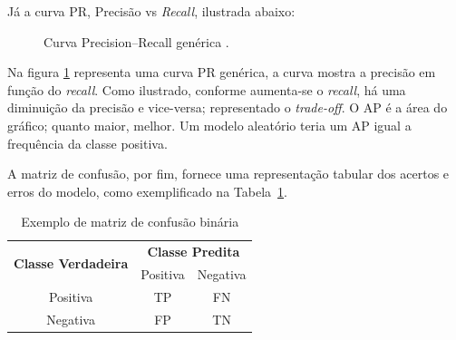 \documentclass[
    12pt,                %
    openright,           %
    oneside,             %
    a4paper,             %
    brazil               %
]{abntex2}
\begin{document}
Já a curva PR, Precisão vs \textit{Recall}, ilustrada abaixo:


\pgfplotsset{compat=1.18}

\begin{figure}[H]
    \centering
    \caption{Curva Precision–Recall genérica .}
    \label{fig:pr_curve_nv}
\end{figure}


Na figura \ref{fig:pr_curve_nv} representa uma curva PR genérica, a curva mostra a precisão em função do \textit{recall}. Como ilustrado,
conforme aumenta-se o \textit{recall}, há uma diminuição da precisão e vice-versa; representado o \textit{trade-off}. O AP é a área do gráfico; quanto
maior, melhor. Um modelo aleatório teria um AP igual a frequência da classe positiva.

A matriz de confusão, por fim, fornece uma representação tabular dos acertos e erros do modelo, como exemplificado na Tabela~\ref{tab:matriz_confusao}.

\begin{table}[H]
\centering
\caption{Exemplo de matriz de confusão binária}
\label{tab:matriz_confusao}
\begin{tabular}{|c|c|c|}
\hline
\multirow{2}{*}{\textbf{Classe Verdadeira}} & \multicolumn{2}{c|}{\textbf{Classe Predita}} \\ \cline{2-3} 
 & Positiva & Negativa \\ \hline
Positiva & TP & FN \\ \hline
Negativa & FP & TN \\ \hline
\end{tabular}
\end{table}
\end{document}
